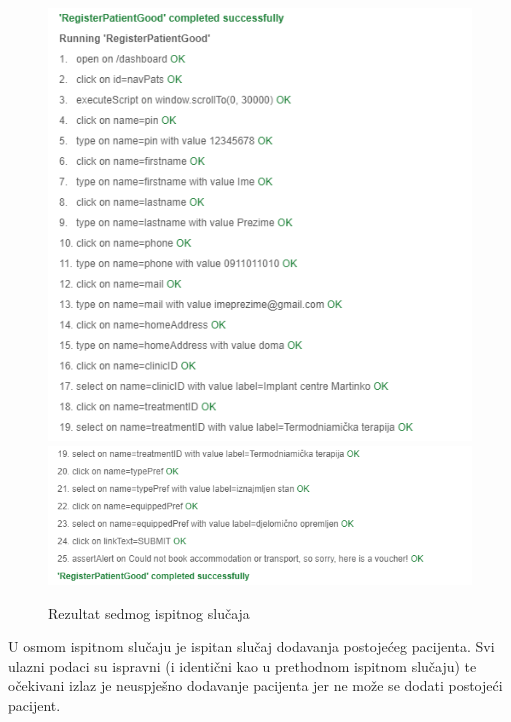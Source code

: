 			\begin{figure}[H]
				\centering
				\includegraphics[width=\textwidth]{"slike/Selenium/pacijent testovi/registerPatientGood_results0.png"}
				\includegraphics[width=\textwidth]{"slike/Selenium/pacijent testovi/registerPatientGood_results1.png"}
				\caption{Rezultat sedmog ispitnog slučaja}
				\label{fig: registerPatientGood_results}
			\end{figure}
			\eject
			U osmom ispitnom slučaju je ispitan slučaj dodavanja postojećeg pacijenta. Svi ulazni podaci su ispravni (i identični kao u prethodnom ispitnom slučaju) te očekivani izlaz je neuspješno dodavanje pacijenta jer ne može se dodati postojeći pacijent.
